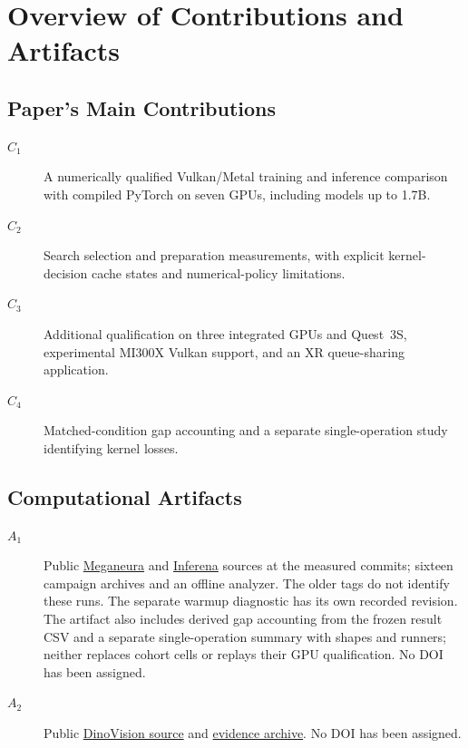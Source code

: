 \appendixAD

\section{Overview of Contributions and Artifacts}

\subsection{Paper's Main Contributions}
\begin{description}
\item[$C_1$] A numerically qualified Vulkan/Metal training and inference
comparison with compiled PyTorch on seven GPUs, including models up to 1.7B.
\item[$C_2$] Search selection and preparation measurements, with explicit
kernel-decision cache states and numerical-policy limitations.
\item[$C_3$] Additional qualification on three integrated GPUs and Quest~3S,
experimental MI300X Vulkan support, and an XR queue-sharing application.
\item[$C_4$] Matched-condition gap accounting and a separate single-operation
study identifying kernel losses.
\end{description}

\subsection{Computational Artifacts}
\begin{description}
\item[$A_1$] Public
\href{https://github.com/kvark/meganeura/tree/567028b805425375148e88a7e1d464fafdd99777}{Meganeura}
and \href{https://github.com/kvark/inferena/tree/a0799e4210eafa25161ec50d475b186c4b19d3da}{Inferena}
sources at the measured commits; sixteen campaign archives and an offline
analyzer. The older  tags do not identify these
runs. The separate warmup diagnostic has its own recorded revision.
The artifact also includes derived gap accounting from the frozen result
CSV and a separate single-operation summary with shapes and runners;
neither replaces cohort cells or replays their GPU qualification. No DOI has been assigned.
\item[$A_2$] Public
\href{https://github.com/kvark/dinovision/tree/dc35cdf1c7c910cdd93c5b5362846842ae469a21}{DinoVision source}
and \href{https://huggingface.co/mad-bot/dinovision/tree/2c3f9017fe74c41482b165890c14737a2ccd4b6a}{evidence archive}.
No DOI has been assigned.
\end{description}

